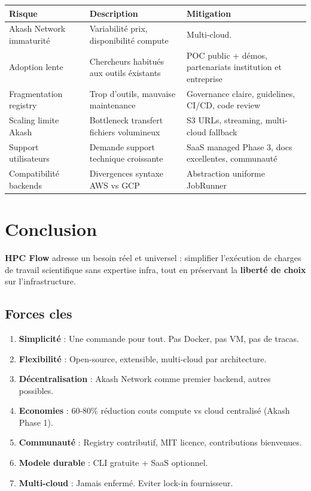 \documentclass[11pt,a4paper]{article}
\newcommand{\highlight}[1]{\textbf{\color{darkblue}#1}}
\begin{document}
	\begin{table}[H]
		\centering
		\small
		\begin{tabularx}{\linewidth}{l | p{5.5cm} | p{4cm}}
			\toprule
			\textbf{Risque} & \textbf{Description} & \textbf{Mitigation} \\
			\midrule
			Akash Network immaturité & Variabilité prix, disponibilité compute & Multi-cloud. \\
			Adoption lente & Chercheurs habitués aux outils éxistants & POC public + démos, partenariats institution et entreprise \\
			Fragmentation registry & Trop d'outils, mauvaise maintenance & Governance claire, guidelines, CI/CD, code review \\
			Scaling limite Akash & Bottleneck transfert fichiers volumineux & S3 URLs, streaming, multi-cloud fallback \\
			Support utilisateurs & Demande support technique croissante & SaaS managed Phase 3, docs excellentes, communauté \\
			Compatibilité backends & Divergences syntaxe AWS vs GCP & Abstraction uniforme JobRunner \\
			\bottomrule
		\end{tabularx}
	\end{table}
	
	\newpage
	
	\section{Conclusion}
	
	\highlight{HPC Flow} adresse un besoin réel et universel : simplifier l'exécution de charges de travail scientifique sans expertise infra, tout en préservant la \textbf{liberté de choix} sur l'infrastructure.
	
	\subsection{Forces cles}
	
	\begin{enumerate}
		\item \textbf{Simplicité} : Une commande pour tout. Pas Docker, pas VM, pas de tracas.
		\item \textbf{Flexibilité} : Open-source, extensible, multi-cloud par architecture.
		\item \textbf{Décentralisation} : Akash Network comme premier backend, autres possibles.
		\item \textbf{Economies} : 60-80\% réduction couts compute vs cloud centralisé (Akash Phase 1).
		\item \textbf{Communauté} : Registry contributif, MIT licence, contributions bienvenues.
		\item \textbf{Modele durable} : CLI gratuite + SaaS optionnel.
		\item \textbf{Multi-cloud} : Jamais enfermé. Eviter lock-in fournisseur.
	\end{enumerate}
	
\end{document}
